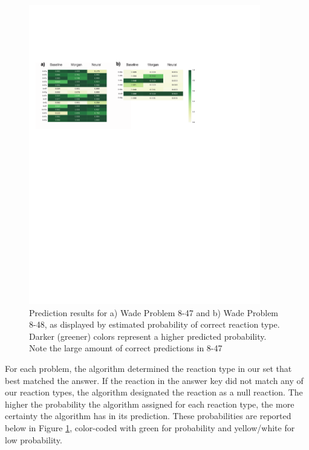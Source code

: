 \begin{figure}
\begin{center}
\includegraphics[trim=20 450 165 140,clip,width=0.9\textwidth]{results_heatmap}
\caption[Performance of Neural Network Models on Test Questions]{\label{fig:Wade_results} Prediction results for a) Wade Problem 8-47 and b) Wade Problem 8-48, as displayed by estimated probability of correct reaction type. Darker (greener) colors represent a higher predicted probability. Note the large amount of correct predictions in 8-47}
\end{center}
\end{figure}


For each problem, the algorithm determined the reaction type in our set that best matched the answer. If the reaction in the answer key did not match any of our reaction types, the algorithm designated the reaction as a null reaction. The higher the probability the algorithm assigned for each reaction type, the more certainty the algorithm has in its prediction. These probabilities are reported below in Figure \ref{fig:Wade_results}, color-coded with green for probability and yellow/white for low probability. 

